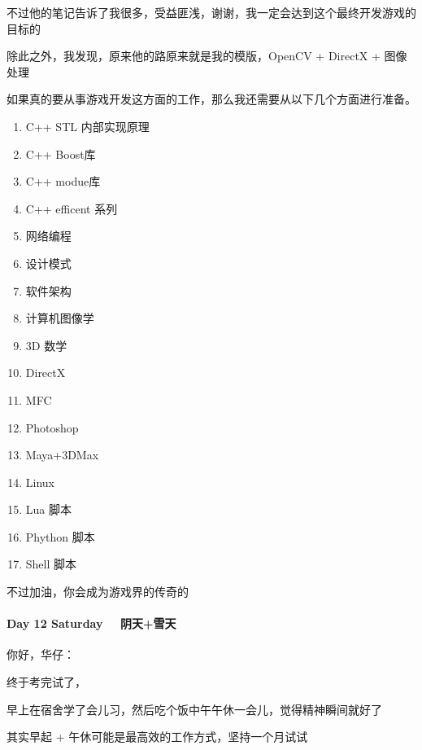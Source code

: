 \documentclass[UTF8,a4paper,8pt]{ctexart}
\begin{document}
       不过他的笔记告诉了我很多，受益匪浅，谢谢，我一定会达到这个最终开发游戏的目标的
       
       除此之外，我发现，原来他的路原来就是我的模版，OpenCV + DirectX + 图像处理
       
       如果真的要从事游戏开发这方面的工作，那么我还需要从以下几个方面进行准备。
      
       \begin{enumerate}[fullwidth,itemindent=2em,label=(\arabic*)]
       	
       \item C++ STL 内部实现原理
       \item C++ Boost库
       \item C++ modue库
       \item C++ efficent 系列
       \item 网络编程
       
       \item 设计模式
       \item 软件架构
       
       \item 计算机图像学
       \item 3D 数学
       \item DirectX
       \item MFC 
       
       \item Photoshop
       \item Maya+3DMax
       
       \item Linux
       \item Lua 脚本
       \item Phython 脚本
       \item Shell 脚本
        	
       \end{enumerate}
       不过加油，你会成为游戏界的传奇的
       
        \paragraph{Day 12 Saturday \ \ 阴天+雪天}
        
        你好，华仔：
        
        终于考完试了，
        
        早上在宿舍学了会儿习，然后吃个饭中午午休一会儿，觉得精神瞬间就好了
        
        其实早起 + 午休可能是最高效的工作方式，坚持一个月试试
        
\end{document}
